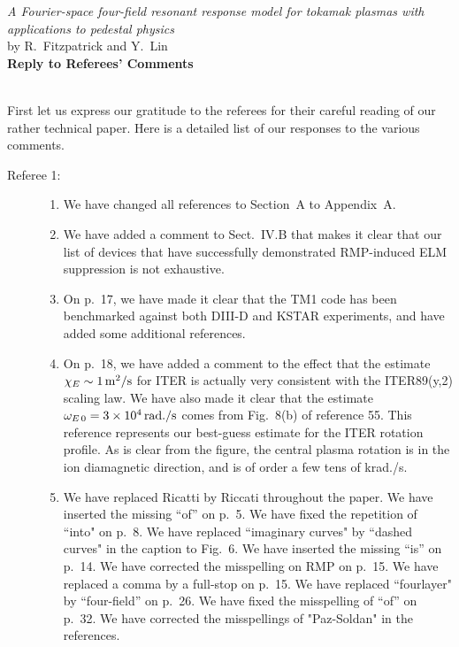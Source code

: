 \documentclass{article}[12pt]
\begin{document}
\begin{center}
{\em  A Fourier-space four-field resonant response model for tokamak plasmas with applications to pedestal physics}\\[1ex]
by R.~Fitzpatrick and Y.~Lin\\[1ex]
{\bf Reply to Referees' Comments}\\[1ex]
~
\end{center}

First let us express our gratitude to the referees for their careful reading of our rather technical paper. Here is a detailed list of
our responses to the various comments. 

\begin{description}
\item[Referee 1:]

\begin{enumerate}
\item We have changed all references to Section~A to Appendix~A. 
\item We have added a comment to Sect.~IV.B that makes it clear that our list of devices that have successfully demonstrated
RMP-induced ELM suppression is not exhaustive. 
\item On p.~17, we have made it clear that the TM1 code has been benchmarked against both DIII-D and KSTAR experiments, and
have added some additional references. 
\item On p.~18, we have added a comment to the effect that the estimate $\chi_E\sim 1\,{\rm m^2/s}$ for ITER is actually very consistent
with the ITER89(y,2) scaling law. We have also made it clear that the estimate $\omega_{E\,0}=3\times 10^4\,{\rm rad./s}$ comes from
Fig.~8(b) of reference 55. This reference represents our best-guess estimate for the ITER rotation profile. As is clear from the figure, the
central plasma rotation is in the ion diamagnetic direction, and is of order a few tens of krad./s. 
\item We have replaced Ricatti by Riccati throughout the paper. We have inserted the missing ``of'' on p.~5. We have fixed the repetition of
``into" on p.~8. We have replaced ``imaginary curves" by ``dashed curves" in the caption to Fig.~6. We have inserted the missing ``is''
on p.~14. We have corrected the misspelling on RMP on p.~15. We have replaced a comma by a full-stop on p.~15. We have
replaced ``fourlayer" by ``four-field'' on p.~26. We have fixed the misspelling of ``of'' on p.~32. We have corrected the misspellings of
"Paz-Soldan" in the references. 
\end{enumerate}



\end{description}
\end{document}
